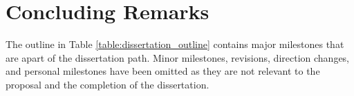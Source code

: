 \section{Concluding Remarks}
\label{proposal:conclusion}

The outline in Table \ref{table:dissertation_outline} contains major milestones that are apart of the dissertation path. Minor milestones, revisions, direction changes, and personal milestones have been omitted as they are not relevant to the proposal and the completion of the dissertation.